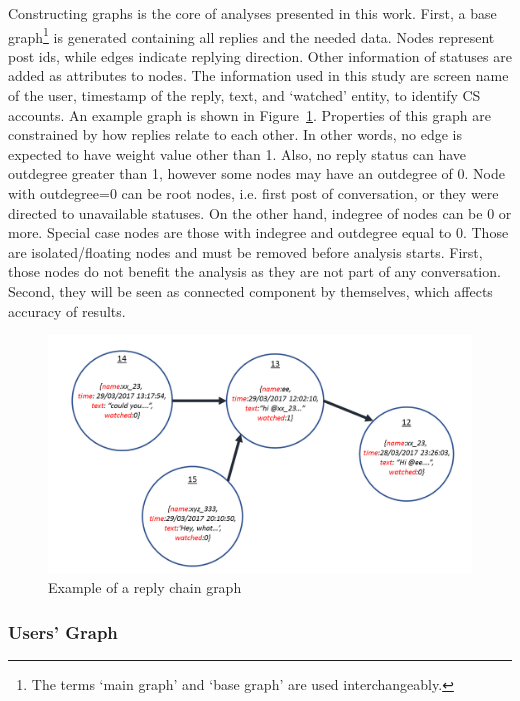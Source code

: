 \documentclass[sigconf]{acmart}
\begin{document}
Constructing graphs is the core of analyses presented in this work. 
First, a base graph\footnote{The terms `main graph' and `base graph' are 
used interchangeably.} is generated containing all replies and the needed data. 
Nodes represent post ids, while edges indicate replying direction. Other 
information of statuses are added as attributes to nodes. The information used in
this study are screen name of the user, timestamp of the reply, text,
and `watched' entity, to identify CS accounts. An example graph is
shown in Figure~\ref{fig:replychaingraph}. Properties of this graph
are constrained by how replies relate to each other. In other words,
no edge is expected to have weight value other than 1. Also, no reply
status can have outdegree greater than 1, however some nodes may have
an outdegree of 0. Node with outdegree=0 can be root nodes, i.e. first
post of conversation, or they were directed to unavailable
statuses. On the other hand, indegree of nodes can be 0 or
more. Special case nodes are those with indegree and outdegree equal
to 0. Those are isolated/floating nodes and must be removed before
analysis starts. First, those nodes do not benefit the analysis as
they are not part of any conversation. Second, they will be seen as
connected component by themselves, which affects accuracy of results.

\begin{figure}[htb]
\centering
\includegraphics[width=\columnwidth]{images/replychaingraph.png}
\caption{Example of a reply chain graph}
\label{fig:replychaingraph}
\end{figure}

\subsubsection{Users' Graph}
\end{document}
